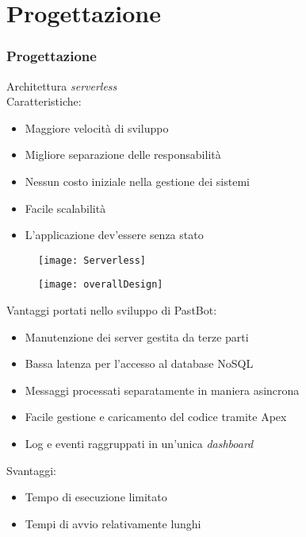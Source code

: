 
\section{Progettazione}
\begin{frame}

  \frametitle{Progettazione}

  Architettura \textit{serverless}\\
  Caratteristiche:
  \begin{itemize}
  \item Maggiore velocit\`a di sviluppo
  \item Migliore separazione delle responsabilit\`a
  \item Nessun costo iniziale nella gestione dei sistemi
  \item Facile scalabilit\`a
  \item L'applicazione dev'essere senza stato
  \end{itemize}

  \begin{figure}[H]
    \centering
    \texttt{[image: Serverless]}
  \end{figure}
\end{frame}

\begin{frame}

  \begin{figure}[H]
    \centering
    \texttt{[image: overallDesign]}
  \end{figure}
\end{frame}

\begin{frame}

  Vantaggi portati nello sviluppo di PastBot:
  \begin{itemize}
  \item Manutenzione dei server gestita da terze parti
  \item Bassa latenza per l'accesso al database NoSQL
  \item Messaggi processati separatamente in maniera asincrona
  \item Facile gestione e caricamento del codice tramite Apex
  \item Log e eventi raggruppati in un'unica \textit{dashboard}
  \end{itemize}


  Svantaggi:
  \begin{itemize}
  \item Tempo di esecuzione limitato
  \item Tempi di avvio relativamente lunghi
  \end{itemize}
  

\end{frame}
